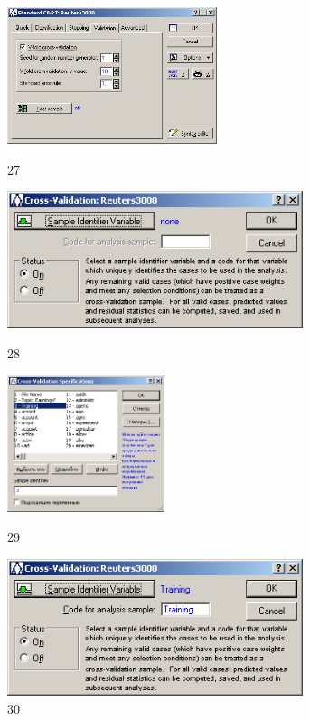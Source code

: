 \begin{figure}[!h]
  \centering

  \begin{minipage}{0.49\textwidth}
    \centering

    \includegraphics[height=4cm]
    {inc/27.PNG}

    \caption{27}

    \label{fig:27}
  \end{minipage}
  \begin{minipage}{0.49\textwidth}
    \centering

    \includegraphics[height=4cm]
    {inc/28.PNG}

    \caption{28}

    \label{fig:28}
  \end{minipage}
  \begin{minipage}{0.49\textwidth}
    \centering

    \includegraphics[height=4cm]
    {inc/29.PNG}

    \caption{29}

    \label{fig:29}
  \end{minipage}
  \begin{minipage}{0.49\textwidth}
    \centering

    \includegraphics[height=4cm]
    {inc/30.PNG}

    \caption{30}

    \label{fig:30}
  \end{minipage}
\end{figure}

